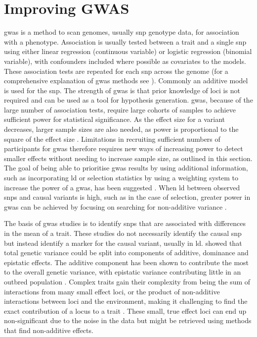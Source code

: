 \documentclass[twoside,openright]{report}
\begin{document}
\section{Improving GWAS}\label{improving-gwas}

\Gls{gwas} is a method to scan genomes, usually \gls{snp} genotype data,
for association with a phenotype. Association is usually tested between
a trait and a single \gls{snp} using either linear regression
(continuous variable) or logistic regression (binomial variable), with
confounders included where possible as covariates to the models. These
association tests are repeated for each \gls{snp} across the genome (for
a comprehensive explanation of \gls{gwas} methods see
\citet{bush_chapter_2012}). Commonly an additive model is used for the
\gls{snp}. The strength of \gls{gwas} is that prior knowledge of loci is
not required and can be used as a tool for hypothesis generation.
\Gls{gwas}, because of the large number of association tests, require
large cohorts of samples to achieve sufficient power for statistical
significance. As the effect size for a variant decreases, larger sample
sizes are also needed, as power is proportional to the square of the
effect size \citep{Hemani2013, Korte2013}. Limitations in recruiting
sufficient numbers of participants for \gls{gwas} therefore requires new
ways of increasing power to detect smaller effects without needing to
increase sample size, as outlined in this section. The goal of being
able to prioritise \gls{gwas} results by using additional information,
such as incorporating \gls{ld} or selection statistics by using a
weighting system to increase the power of a \gls{gwas}, has been
suggested \citep{Roeder2006, Ayodo2007}. When \gls{ld} between observed
\glspl{snp} and causal variants is high, such as in the case of
selection, greater power in \gls{gwas} can be achieved by focusing on
searching for non-additive variance \citep{Hemani2013}.

The basis of \gls{gwas} studies is to identify \glspl{snp} that are
associated with differences in the mean of a trait. These studies do not
necessarily identify the causal \gls{snp} but instead identify a marker
for the causal variant, usually in \gls{ld}. \citet{Fisher1919} showed
that total genetic variance could be split into components of additive,
dominance and epistatic effects. The additive component has been shown
to contribute the most to the overall genetic variance, with epistatic
variance contributing little in an outbred population \citep{Hill2008}.
Complex traits gain their complexity from being the sum of interactions
from many small effect loci, or the product of non-additive interactions
between loci and the environment, making it challenging to find the
exact contribution of a locus to a trait \citep{Fu2013a}. These small,
true effect loci can end up non-significant due to the noise in the data
but might be retrieved using methods that find non-additive effects.
\end{document}
